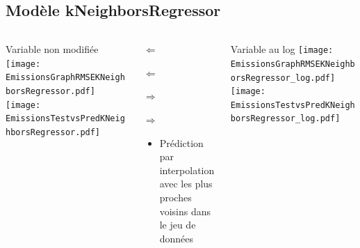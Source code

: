 \documentclass[8pt,aspectratio=169,hyperref={unicode=true}]{beamer}
\begin{document}
\subsection{Modèle kNeighborsRegressor}
\begin{frame}{\insertsubsection}
  \begin{columns}[t]
    \begin{column}{.33\textwidth}
      \centering Variable non modifiée
      \texttt{[image: EmissionsGraphRMSEKNeighborsRegressor.pdf]}
      \texttt{[image: EmissionsTestvsPredKNeighborsRegressor.pdf]}
    \end{column}
    \begin{column}{.33\textwidth}
      $\Longleftarrow$
      \scriptsize
      {\centering
        }
      

      \normalsize
      $\Longleftarrow$

      \raggedleft $\Longrightarrow$
      \scriptsize
      {\centering
        }
      

      \normalsize
      $\Longrightarrow$

      \raggedright
      \begin{itemize}
        \item Prédiction par interpolation avec les plus proches voisins dans le jeu de données
      \end{itemize}
    \end{column}
    \begin{column}{.33\textwidth}
      \centering Variable au log
      \texttt{[image: EmissionsGraphRMSEKNeighborsRegressor\_log.pdf]}
      \texttt{[image: EmissionsTestvsPredKNeighborsRegressor\_log.pdf]}
    \end{column}
  \end{columns}
\end{frame}
\end{document}
